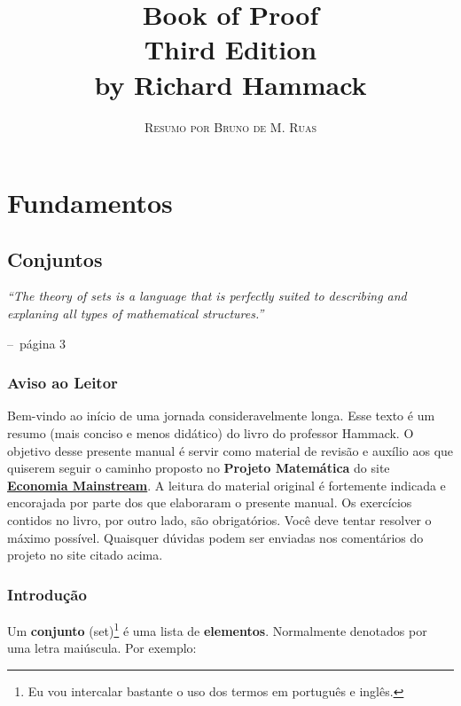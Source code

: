 \documentclass[a4paper,11pt]{book}
\title{\Huge \textbf{Book of Proof} \\ 
\Large Third Edition \\
\huge by Richard Hammack}
\author{\textsc{Resumo por Bruno de M. Ruas}}
\makeatletter
\theoremstyle{definition}
\newenvironment{chapquote}[2][2em]
  {\setlength{\@tempdima}{#1}%
   \def\chapquote@author{#2}%
   \parshape 1 \@tempdima \dimexpr\textwidth-2\@tempdima\relax%
   \itshape}
  {\par\normalfont\hfill--\ \chapquote@author\hspace*{\@tempdima}\par\bigskip}
\makeatother
\begin{document}
\frontmatter
\maketitle

\tableofcontents

\mainmatter

\part{Fundamentos}

\chapter{Conjuntos}

\begin{chapquote}{página 3}
	``The theory of sets is a language that is perfectly suited to describing and explaning all types of mathematical structures.''
\end{chapquote}


\section*{Aviso ao Leitor}
Bem-vindo ao início de uma jornada consideravelmente longa. Esse texto é um resumo (mais conciso e menos didático) do livro do professor Hammack. O objetivo desse presente manual é servir como material de revisão e auxílio aos que quiserem seguir o caminho proposto no \textbf{Projeto Matemática} do site \href{https://economiamainstream.com.br/artigo/matematica/}{\textbf{Economia Mainstream}}. A leitura do material original é fortemente indicada e encorajada por parte dos que elaboraram o presente manual. Os exercícios contidos no livro, por outro lado, são obrigatórios. Você deve tentar resolver o máximo possível. Quaisquer dúvidas podem ser enviadas nos comentários do projeto no site citado acima.

\section{Introdução}
Um \textbf{conjunto} (set)\footnote{Eu vou intercalar bastante o uso dos termos em português e inglês.} é uma lista de \textbf{elementos}. Normalmente denotados por uma letra maiúscula. Por exemplo:
\end{document}
